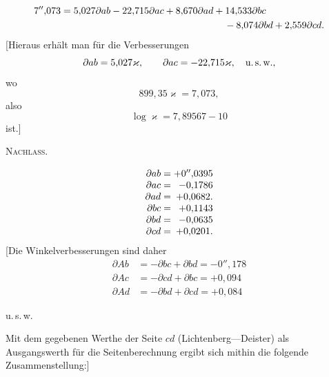 \[
\begin{aligned}
7''{,}073={}&5{,}027\partial ab-22{,}715\partial ac+8{,}670\partial ad+14{,}533\partial bc\\
&\hspace{5.5cm}-8{,}074\partial bd+2{,}559\partial cd.
\end{aligned}
\]
[Hieraus erhält man für die Verbesserungen
\[
\partial ab=5{,}027\varkappa,\qquad\partial ac=-22{,}715\varkappa,\quad\text{u.\,s.\,w.,}
\]
\noindent wo
\[
899{,}35\varkappa=7{,}073,
\]
\noindent also
\[
\log\varkappa=7{,}89567-10
\]
\noindent ist.]

\clearpage
{}\hfill\textsc{Nachlass.}\hfill\mbox{}\par\medskip
\[
\begin{array}{r@{\;}c@{\;}r}
\partial ab&=&+0''{,}0395\\
\partial ac&=&-0{,}1786\\
\partial ad&=&+0{,}0682.\\
\partial bc&=&+0{,}1143\\
\partial bd&=&-0{,}0635\\
\partial cd&=&+0{,}0201.
\end{array}
\]
[Die Winkelverbesserungen sind daher
\[
\begin{aligned}
\partial Ab&=-\partial bc+\partial bd=-0''{,}178\\
\partial Ac&=-\partial cd+\partial bc=+0{,}094\\
\partial Ad&=-\partial bd+\partial cd=+0{,}084
\end{aligned}
\]
\begin{center}u.\,s.\,w.\end{center}
Mit dem gegebenen Werthe der Seite $cd$ (Lichtenberg---Deister) als Ausgangswerth für die Seitenberechnung ergibt sich mithin die folgende Zusammenstellung:]
